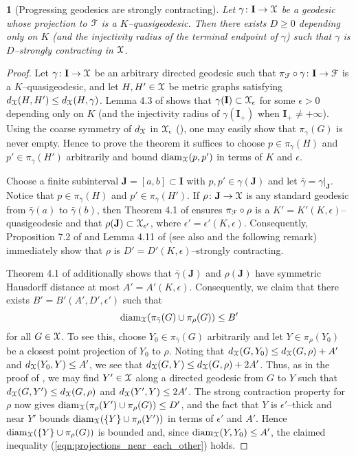 \documentclass[letterpaper,fleqn]{article}
\theoremstyle{plain}
\newtheorem*{thm:progress}{\Cref{th: BF_contract}}
\theoremstyle{definition}
\DeclareMathOperator{\diam}{diam}
\newcommand{\factor}{{\EuScript F}} %
\newcommand{\F}{\factor} %
\newcommand{\fc}{\factor} %
\newcommand{\os}{{\EuScript X}} %
\newcommand{\X}{\os}
\newcommand{\fproj}{\pi_\fc} %
\newcommand{\cp}{\pi} %
\renewcommand{\diam}{\mathrm{diam}}
\newcommand{\I}{\mathbf{I}}
\newcommand{\Ipl}{\I_+}
\newcommand{\J}{\mathbf{J}}
\begin{document}
\begin{thm:progress}[Progressing geodesics are strongly contracting] 
Let $\gamma\colon \I \to \X$ be a geodesic whose projection to $\F$ is a $K$--quasigeodesic. Then there exists $D \ge 0$ depending only on $K$ (and the injectivity radius of the terminal endpoint of $\gamma$) such that $\gamma$ is $D$--strongly contracting in $\X$.
\end{thm:progress}
\begin{proof}%
Let $\gamma\colon\I\to\os$ be an arbitrary directed geodesic such that $\fproj\circ\gamma\colon\I\to\fc$ is a $K$--quasigeodesic, and let $H,H'\in\os$ be metric graphs satisfying $d_\os(H,H')\le d_\os(H,\gamma)$. Lemma 4.3 of \cite{DT1} shows that $\gamma(\I)\subset \os_{\epsilon}$ for some $\epsilon > 0$ depending only on $K$ (and the injectivity radius of $\gamma(\Ipl)$ when $\Ipl \ne +\infty$). Using the coarse symmetry of $d_\os$ in $\os_{\epsilon}$ (), one may easily show that $\cp_\gamma(G)$ is never empty. Hence to prove the theorem it suffices to choose $p\in \cp_\gamma(H)$ and $p'\in\cp_\gamma(H')$ arbitrarily and bound $\diam_\os(p,p')$ in terms of $K$ and $\epsilon$.

Choose a finite subinterval $\J=[a,b]\subset\I$ with $p,p'\in\gamma(\J)$ and let $\bar{\gamma} = \gamma\vert_{\J}$. Notice that $p\in\cp_{\bar\gamma}(H)$ and $p'\in \cp_{\bar\gamma}(H')$. If $\rho\colon\J\to\os$ is any standard geodesic from $\bar\gamma(a)$ to $\bar\gamma(b)$, 
then Theorem 4.1 of \cite{DT1} ensures $\fproj\circ\rho$ is a $K'=K'(K,\epsilon)$--quasigeodesic and that $\rho(\J)\subset \os_{\epsilon'}$, where  $\epsilon'=\epsilon'(K,\epsilon)$. Consequently, Proposition 7.2 of \cite{BFhyp} and Lemma 4.11 of \cite{DT1} (see also \cite[Proposition 2.10]{DT1} and the following remark) immediately show that $\rho$ is $D'=D'(K,\epsilon)$--strongly contracting. 

Theorem 4.1 of \cite{DT1} additionally shows that $\bar\gamma(\J)$ and $\rho(\J)$ have symmetric Hausdorff distance at most $A' = A'(K,\epsilon)$. Consequently, we claim that there exists $B' = B'(A',D',\epsilon')$ such that 
\begin{equation}
\label{eqn:projections_near_each_other}
\diam_\os(\cp_{\bar\gamma}(G)\cup\cp_\rho(G))\le B'
\end{equation}
for all $G\in \os$. To see this, choose $Y_0\in\cp_{\bar\gamma}(G)$ arbitrarily and let $Y\in \cp_\rho(Y_0)$ be a closest point projection of $Y_0$ to $\rho$. Noting that $d_\os(G,Y_0)\le d_\os(G,\rho) + A'$ and $d_\os(Y_0,Y)\le A'$, we see that $d_\os(G,Y)\le d_\os(G,\rho) + 2A'$. Thus, as in the proof of , we may find $Y'\in \os$ along a directed geodesic from $G$ to $Y$ such that $d_\os(G,Y')\le d_\os(G,\rho)$ and $d_\os(Y',Y)\le 2A'$. The strong contraction property for $\rho$ now gives $\diam_\os(\cp_\rho(Y')\cup\cp_\rho(G))\le D'$, and the fact that $Y$ is $\epsilon'$--thick and near $Y'$ bounds $\diam_\os(\{Y\}\cup\cp_\rho(Y'))$ in terms of $\epsilon'$ and $A'$. Hence $\diam_\X(\{Y\}\cup\cp_\rho(G))$ is bounded and, since $\diam_\os(Y,Y_0)\le A'$, the claimed inequality (\ref{eqn:projections_near_each_other}) holds.


\end{proof}
\end{document}
